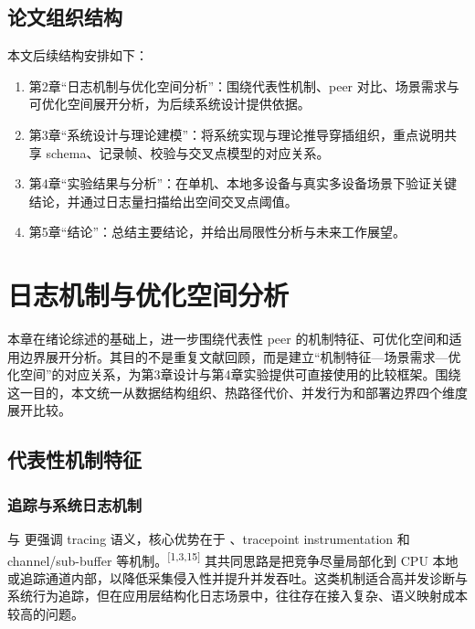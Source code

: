 \subsection{论文组织结构}\label{ux8bbaux6587ux7ec4ux7ec7ux7ed3ux6784}

本文后续结构安排如下：

\begin{enumerate}
\def\labelenumi{\arabic{enumi}.}
\tightlist
\item
  第2章``日志机制与优化空间分析''：围绕代表性机制、peer 对比、场景需求与可优化空间展开分析，为后续系统设计提供依据。
\item
  第3章``系统设计与理论建模''：将系统实现与理论推导穿插组织，重点说明共享 schema、记录帧、校验与交叉点模型的对应关系。
\item
  第4章``实验结果与分析''：在单机、本地多设备与真实多设备场景下验证关键结论，并通过日志量扫描给出空间交叉点阈值。
\item
  第5章``结论''：总结主要结论，并给出局限性分析与未来工作展望。
\end{enumerate}

\section{日志机制与优化空间分析}\label{ux65e5ux5fd7ux673aux5236ux4e0eux4f18ux5316ux7a7aux95f4ux5206ux6790}

本章在绪论综述的基础上，进一步围绕代表性 peer 的机制特征、可优化空间和适用边界展开分析。其目的不是重复文献回顾，而是建立``机制特征---场景需求---优化空间''的对应关系，为第3章设计与第4章实验提供可直接使用的比较框架。围绕这一目的，本文统一从数据结构组织、热路径代价、并发行为和部署边界四个维度展开比较。

\subsection{代表性机制特征}\label{ux4ee3ux8868ux6027ux673aux5236ux7279ux5f81}

\subsubsection{追踪与系统日志机制}\label{ux8ffdux8e2aux4e0eux7cfbux7edfux65e5ux5fd7ux673aux5236}

 与  更强调 tracing 语义，核心优势在于 、tracepoint instrumentation 和 channel/sub-buffer 等机制。\textsuperscript{[1,3,15]} 其共同思路是把竞争尽量局部化到 CPU 本地或追踪通道内部，以降低采集侵入性并提升并发吞吐。这类机制适合高并发诊断与系统行为追踪，但在应用层结构化日志场景中，往往存在接入复杂、语义映射成本较高的问题。

